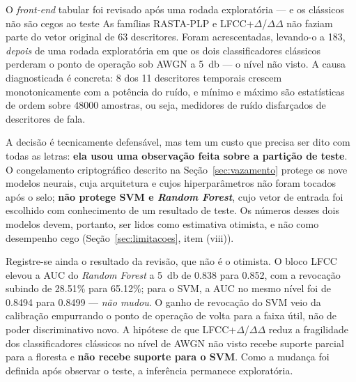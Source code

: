 \documentclass[12pt,a4paper]{article}
\begin{document}
\begin{warningbox}{O \textit{front-end} tabular foi revisado após uma rodada
		exploratória --- e os clássicos não são cegos ao teste}
	As famílias RASTA-PLP e LFCC+$\Delta$/$\Delta\Delta$ não faziam parte do vetor
	original de \num{63} descritores. Foram acrescentadas, levando-o a \num{183},
	\emph{depois} de uma rodada exploratória em que os dois classificadores
	clássicos perderam o ponto de operação sob AWGN a \SI{5}{\decibel} --- o nível
	não visto. A causa diagnosticada é concreta: \num{8} dos \num{11} descritores
	temporais crescem monotonicamente com a potência do ruído, e mínimo e máximo
	são estatísticas de ordem sobre \num{48000} amostras, ou seja, medidores de
	ruído disfarçados de descritores de fala.
	
	A decisão é tecnicamente defensável, mas tem um custo que precisa ser dito com
	todas as letras: \textbf{ela usou uma observação feita sobre a partição de
		teste}. O congelamento criptográfico descrito na Seção~\ref{sec:vazamento}
	protege os nove modelos neurais, cuja arquitetura e cujos hiperparâmetros não
	foram tocados após o selo; \textbf{não protege SVM e \textit{Random Forest}},
	cujo vetor de entrada foi escolhido com conhecimento de um resultado de teste.
	Os números desses dois modelos devem, portanto, ser lidos como estimativa
	otimista, e não como desempenho cego (Seção~\ref{sec:limitacoes}, item (viii)).
	
	Registre-se ainda o resultado da revisão, que não é o otimista. O bloco LFCC
	elevou a AUC do \textit{Random Forest} a \SI{5}{\decibel} de \num{0,838} para
	\num{0,852}, com a revocação subindo de \num{28,51}\% para \num{65,12}\%; para
	o SVM, a AUC no mesmo nível foi de \num{0,8494} para \num{0,8499} ---
	\emph{não mudou}. O ganho de revocação do SVM veio da calibração empurrando o
	ponto de operação de volta para a faixa útil, não de poder discriminativo novo.
	A hipótese de que LFCC+$\Delta$/$\Delta\Delta$ reduz a fragilidade dos
	classificadores clássicos no nível de AWGN não visto recebe suporte parcial
	para a floresta e \textbf{não recebe suporte para o SVM}. Como a mudança foi
	definida após observar o teste, a inferência permanece exploratória.
\end{warningbox}
\end{document}
